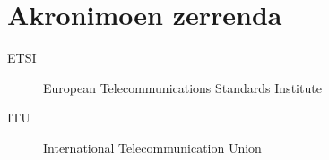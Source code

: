 \chapter*{Akronimoen zerrenda}

\begin{description}
    \item [ETSI] European Telecommunications Standards Institute
    \item [ITU] International Telecommunication Union
\end{description}